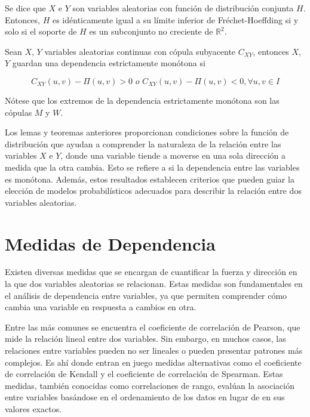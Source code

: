 \begin{teor}
    Se dice que $X$ e $Y$ son variables aleatorias con función de distribución conjunta $H$. Entonces, $H$ es idénticamente igual a su límite inferior de Fréchet-Hoeffding si y solo si el soporte de $H$ es un subconjunto no creciente de $\mathbb{R}^2$.
\end{teor}

\begin{defn}
    Sean $X$, $Y$ variables aleatorias continuas con cópula subyacente $C_{XY}$, entonces $X$, $Y$ guardan una dependencia
    estrictamente monótona si 
    
    \begin{equation}
        C_{XY}(u, v) - \Pi(u, v) > 0 \textit{ o } C_{XY}(u, v) - \Pi(u, v) < 0, \forall u, v \in I
    \end{equation}
    
    Nótese que los extremos de la dependencia estrictamente monótona son las cópulas $M$ y $W$. \cite[pág 42]{TesisEmanuel}
\end{defn}


Los lemas y teoremas anteriores proporcionan condiciones sobre la función de distribución que ayudan a comprender la naturaleza de la relación entre las variables $X$ e $Y$, donde una variable tiende a moverse en una sola dirección a medida que la otra cambia. Esto se refiere a si la dependencia entre las variables es monótona. Además, estos resultados establecen criterios que pueden guiar la elección de modelos probabilísticos adecuados para describir la relación entre dos variables aleatorias.

\section{Medidas de Dependencia}

Existen diversas medidas que se encargan de cuantificar la fuerza y dirección en la que dos variables aleatorias se relacionan. Estas medidas son fundamentales en el análisis de dependencia entre variables, ya que permiten comprender cómo cambia una variable en respuesta a cambios en otra. 

Entre las más comunes se encuentra el coeficiente de correlación de Pearson, que mide la relación lineal entre dos variables. Sin embargo, en muchos casos, las relaciones entre variables pueden no ser lineales o pueden presentar patrones más complejos. Es ahí donde entran en juego medidas alternativas como el coeficiente de correlación de Kendall y el coeficiente de correlación de Spearman. Estas medidas, también conocidas como correlaciones de rango, evalúan la asociación entre variables basándose en el ordenamiento de los datos en lugar de en sus valores exactos. \cite{czadoAnalyzing}



